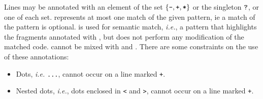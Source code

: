 \begin{grammar}
%
%
%
%
%
%

\end{grammar}

\begin{grammar}
  \CASE{}


\end{grammar}

\noindent
Lines may be annotated with an element of the set $\{\mbox{\tt{{-}}}, \mbox{\tt{{+}}},
\mbox{\tt{{*}}}\}$ or the singleton $\mbox{\tt{{?}}}$, or one of each set. 
represents at most one match of the given pattern, ie a match of the
pattern is optional. \mtt{*} is used for
semantic match, \emph{i.e.}, a pattern that highlights the fragments
annotated with \mtt{*}, but does not perform any modification of the
matched code. \mtt{*} cannot be mixed with \mtt{-} and \mtt{+}.  There are
some constraints on the use of these annotations:
\begin{itemize}
\item Dots, {\em i.e.} \texttt{...}, cannot occur on a line marked
  \texttt{+}.
\item Nested dots, {\em i.e.}, dots enclosed in {\tt <} and {\tt >}, cannot
  occur on a line marked \texttt{+}.
\end{itemize}

